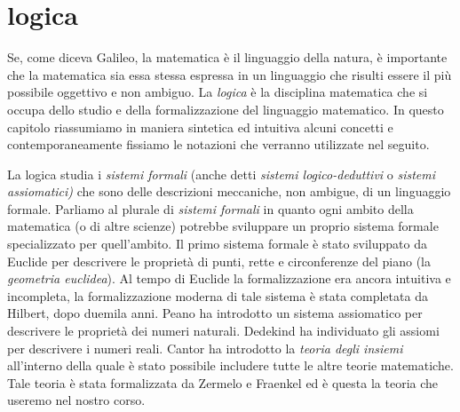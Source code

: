 \section{logica}

Se, come diceva Galileo, la matematica è il linguaggio della natura,
è importante che la matematica sia essa stessa espressa in un linguaggio
che risulti essere il più possibile oggettivo e non ambiguo.
La \emph{logica} è la disciplina matematica che si occupa
dello studio e della formalizzazione del linguaggio matematico.
In questo capitolo riassumiamo in maniera sintetica ed intuitiva
alcuni concetti e contemporaneamente
fissiamo le notazioni che verranno utilizzate nel seguito.

La logica studia i \emph{sistemi formali}%
%
 (anche detti \emph{sistemi logico-deduttivi}
o \emph{sistemi assiomatici)} che sono delle descrizioni meccaniche, non ambigue, 
di un linguaggio formale. 
Parliamo al plurale di \emph{sistemi formali} in quanto ogni ambito della matematica 
(o di altre scienze) potrebbe sviluppare un proprio sistema formale specializzato per quell'ambito. 
Il primo sistema formale è stato sviluppato da Euclide per descrivere le proprietà 
di punti, rette e circonferenze del piano (la \emph{geometria euclidea}).
Al tempo di Euclide la formalizzazione era ancora intuitiva e incompleta, 
la formalizzazione moderna 
di tale sistema è stata completata da Hilbert, dopo duemila anni.
Peano ha introdotto un sistema assiomatico per descrivere le proprietà dei numeri naturali.
Dedekind ha individuato gli assiomi per descrivere i numeri reali.
Cantor ha introdotto la \emph{teoria degli insiemi} all'interno della quale è stato 
possibile includere tutte le altre teorie matematiche. 
Tale teoria è stata formalizzata da Zermelo e Fraenkel
ed è questa la teoria che useremo nel nostro corso.

